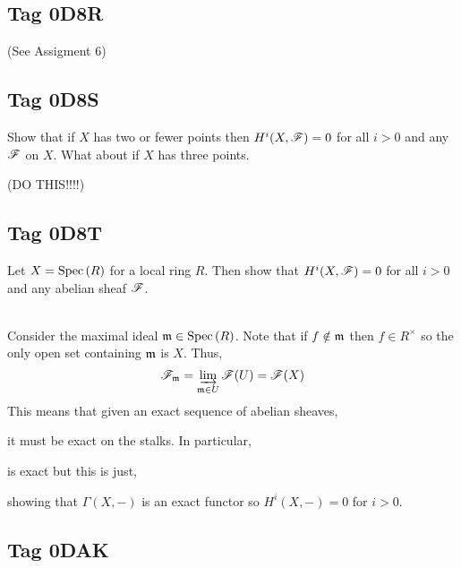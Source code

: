 \documentclass[12pt]{article}
\begin{document}
\subsection{Tag 0D8R}
(See Assigment 6)

\subsection{Tag 0D8S}

\begin{exr}
Show that if $X$ has two or fewer points then $H^i(X, \mathscr{F}) = 0$ for all $i > 0$ and any $\mathscr{F}$ on $X$. What about if $X$ has three points.
\end{exr}
(DO THIS!!!!)

\subsection{Tag 0D8T}

\begin{exr}
Let $X = \mathrm{Spec}\left( R \right)$ for a local ring $R$. Then show that $H^i(X, \mathscr{F}) = 0$ for all $i > 0$ and any abelian sheaf $\mathscr{F}$.
\end{exr}
\noindent\\
Consider the maximal ideal $\mathfrak{m} \in \mathrm{Spec}\left( R \right)$. Note that if $f \notin \mathfrak{m}$ then $f \in R^\times$ so the only open set containing $\mathfrak{m}$ is $X$. Thus,
\[ \mathscr{F}_{\mathfrak{m}} = \varinjlim_{\mathfrak{m} \in U} \mathscr{F}(U) = \mathscr{F}(X) \]
This means that given an exact sequence of abelian sheaves,
\begin{center}
\end{center}
it must be exact on the stalks. In particular,
\begin{center}
\end{center}
is exact but this is just,
\begin{center}
\end{center}
showing that $\Gamma(X, -)$ is an exact functor so $H^i(X, -) = 0$ for $i > 0$. 

\subsection{Tag 0DAK}
\end{document}
